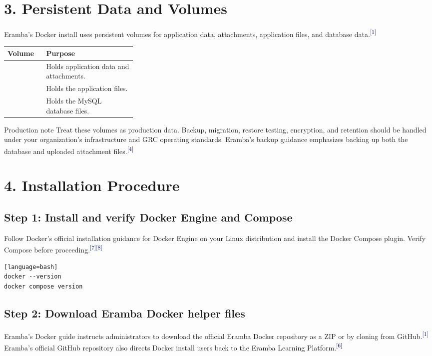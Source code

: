 \documentclass[10pt,letterpaper]{article}
\newcommand{\source}[1]{\textsuperscript{\textcolor{navy}{#1}}}
\begin{document}
\section{3. Persistent Data and Volumes}
Eramba's Docker install uses persistent volumes for application data, attachments, application files, and database data.\source{[1]}

\begin{center}
\begin{tabularx}{\linewidth}{L{0.30\linewidth}Y}
\toprule
\textbf{Volume} & \textbf{Purpose} \\
\midrule
{} & Holds application data and attachments. \\
 & Holds the application files. \\
 & Holds the MySQL database files. \\
\bottomrule
\end{tabularx}
\end{center}

\begin{warningbox}{Production note}
Treat these volumes as production data. Backup, migration, restore testing, encryption, and retention should be handled under your organization's infrastructure and GRC operating standards. Eramba's backup guidance emphasizes backing up both the database and uploaded attachment files.\source{[4]}
\end{warningbox}

\section{4. Installation Procedure}
\subsection{Step 1: Install and verify Docker Engine and Compose}
Follow Docker's official installation guidance for Docker Engine on your Linux distribution and install the Docker Compose plugin. Verify Compose before proceeding.\source{[7]}\source{[8]}

\begin{verbatim}[language=bash]
docker --version
docker compose version
\end{verbatim}

\subsection{Step 2: Download Eramba Docker helper files}
Eramba's Docker guide instructs administrators to download the official Eramba Docker repository as a ZIP or by cloning from GitHub.\source{[1]} Eramba's official GitHub repository also directs Docker install users back to the Eramba Learning Platform.\source{[6]}
\end{document}

